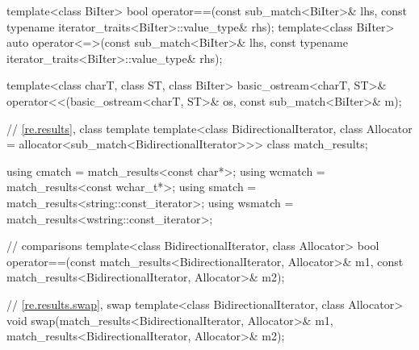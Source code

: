 \begin{codeblock}
{  template<class BiIter>
    bool operator==(const sub_match<BiIter>& lhs,
                    const typename iterator_traits<BiIter>::value_type& rhs);
  template<class BiIter>
    auto operator<=>(const sub_match<BiIter>& lhs,
                     const typename iterator_traits<BiIter>::value_type& rhs);

  template<class charT, class ST, class BiIter>
    basic_ostream<charT, ST>&
      operator<<(basic_ostream<charT, ST>& os, const sub_match<BiIter>& m);

  // \ref{re.results}, class template 
  template<class BidirectionalIterator,
           class Allocator = allocator<sub_match<BidirectionalIterator>>>
    class match_results;

  using cmatch  = match_results<const char*>;
  using wcmatch = match_results<const wchar_t*>;
  using smatch  = match_results<string::const_iterator>;
  using wsmatch = match_results<wstring::const_iterator>;

  //  comparisons
  template<class BidirectionalIterator, class Allocator>
    bool operator==(const match_results<BidirectionalIterator, Allocator>& m1,
                    const match_results<BidirectionalIterator, Allocator>& m2);

  // \ref{re.results.swap},  swap
  template<class BidirectionalIterator, class Allocator>
    void swap(match_results<BidirectionalIterator, Allocator>& m1,
              match_results<BidirectionalIterator, Allocator>& m2);

}
\end{codeblock}
